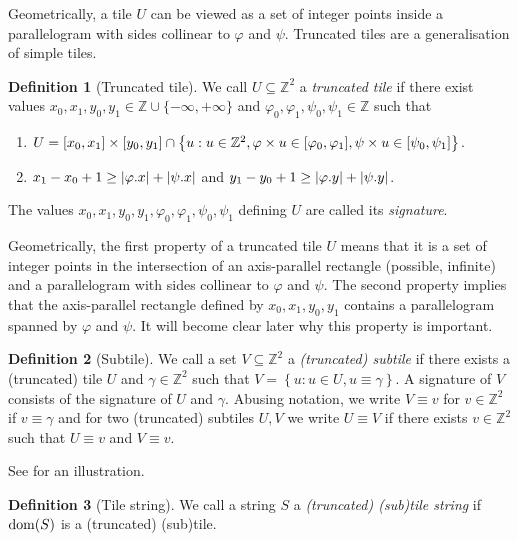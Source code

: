 \documentclass[11pt, letterpaper]{article}
\theoremstyle{plain}
\theoremstyle{definition}
\newtheorem{definition}{Definition}
\theoremstyle{remark}
\newcommand{\Z}{\mathbb{Z}}
\renewcommand{\phi}{\varphi}
\newcommand{\set}[1]{\left\lbrace #1 \right\rbrace}
\newcommand{\absolute}[1]{\left\lvert#1\right\rvert}
\begin{document}
Geometrically, a tile $U$ can be viewed as a set of integer points inside a parallelogram with sides collinear to $\phi$ and $\psi$. Truncated tiles are a generalisation of simple tiles. 

\begin{definition}[Truncated tile]
We call $U \subseteq \Z^2$ a \emph{truncated tile} if there exist values $x_0, x_1, y_0, y_1 \in \Z \cup \{-\infty, +\infty\}$ and $\phi_0, \phi_1, \psi_0, \psi_1 \in \Z$ such that 
	\begin{enumerate}
		\item $U = [x_0, x_1] \times [y_0, y_1] \cap \set{u : u \in \Z^2, \h{u} \in [\phi_0, \phi_1], \s{u} \in [\psi_0, \psi_1]}$. 
		\item $x_1 - x_0 + 1 \ge \absolute{\x{\phi}} + \absolute{\x{\psi}}$ and $y_1 - y_0 + 1 \ge \absolute{\y{\phi}} + \absolute{\y{\psi}}$. 
	\end{enumerate}
The values $x_0, x_1, y_0, y_1, \phi_0, \phi_1, \psi_0, \psi_1$ defining $U$ are called its \emph{signature}. 
\end{definition}

Geometrically, the first property of a truncated tile $U$ means that it is a set of integer points in the intersection of an axis-parallel rectangle (possible, infinite) and a parallelogram with sides collinear to $\phi$ and $\psi$. The second property implies that the axis-parallel rectangle defined by $x_0, x_1, y_0, y_1$ contains a parallelogram spanned by $\phi$ and $\psi$. It will become clear later why this property is important. 

\begin{definition}[Subtile]\label{subtile_definition}
We call a set $V \subseteq \Z^2$ a \emph{(truncated) subtile} if there exists a (truncated) tile $U$ and $\gamma \in \Z^2$ such that $V = \set{u : u \in U, u \equiv \gamma}$. A signature of $V$ consists of the signature of $U$ and $\gamma$. Abusing notation, we write $V \equiv v$ for $v \in \Z^2$ if $v \equiv \gamma$ and for two (truncated) subtiles $U,V$ we write $U \equiv V$ if there exists $v \in \Z^2$ such that $U \equiv v$ and $V \equiv v$.
\end{definition}

See  for an illustration.

\begin{definition}[Tile string]\label{tile_string_definition}
We call a string $S$ a \emph{(truncated) (sub)tile string} if $\operatorname*{dom}(S)$ is a (truncated) (sub)tile.
\end{definition}
\end{document}
